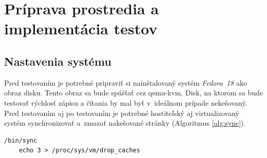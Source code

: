 
%
%

\chapter{Príprava prostredia a implementácia testov}

\section{Nastavenia systému}

Pred testovaním je potrebné pripraviť si nainštalovaný systém \emph{Fedora~18}
ako obraz disku. Tento obraz sa bude spúšťať cez qemu-kvm. Disk, na ktorom sa
bude testovať rýchlosť zápisu a čítania by mal byť v~ideálnom prípade
nekešovaný.  Pred testovaním aj po testovaním je potrebné hostiteľský aj
virtualizovaný systém synchronizovať a~zmazať nakešované stránky (Algoritmus
\ref{alg:sync}).
\\
\begin{lstlisting}[caption=Synchronizácia systému,label=alg:sync]
    /bin/sync
    echo 3 > /proc/sys/vm/drop_caches
\end{lstlisting}

